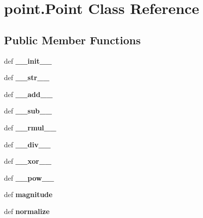 \hypertarget{classpoint_1_1Point}{\section{point.\-Point Class Reference}
\label{classpoint_1_1Point}
}
\subsection*{Public Member Functions}
\begin{DoxyCompactItemize}
\item 
\hypertarget{classpoint_1_1Point_a4f2882f4c1d41b8ed0dcc040a56df10e}{def {\bfseries \-\_\-\-\_\-init\-\_\-\-\_\-}}\label{classpoint_1_1Point_a4f2882f4c1d41b8ed0dcc040a56df10e}

\item 
\hypertarget{classpoint_1_1Point_a1ae81c5e1d69b5ccac1e489a798eff70}{def {\bfseries \-\_\-\-\_\-str\-\_\-\-\_\-}}\label{classpoint_1_1Point_a1ae81c5e1d69b5ccac1e489a798eff70}

\item 
\hypertarget{classpoint_1_1Point_aace59f3313d86fffb9315171d1f68440}{def {\bfseries \-\_\-\-\_\-add\-\_\-\-\_\-}}\label{classpoint_1_1Point_aace59f3313d86fffb9315171d1f68440}

\item 
\hypertarget{classpoint_1_1Point_a63d6c9a6aaf7b41618ff8b18336eb6bd}{def {\bfseries \-\_\-\-\_\-sub\-\_\-\-\_\-}}\label{classpoint_1_1Point_a63d6c9a6aaf7b41618ff8b18336eb6bd}

\item 
\hypertarget{classpoint_1_1Point_a4c61f633eea69f44555e8d42852cbfbc}{def {\bfseries \-\_\-\-\_\-rmul\-\_\-\-\_\-}}\label{classpoint_1_1Point_a4c61f633eea69f44555e8d42852cbfbc}

\item 
\hypertarget{classpoint_1_1Point_a74924a7729713d7115462c3390e0cba8}{def {\bfseries \-\_\-\-\_\-div\-\_\-\-\_\-}}\label{classpoint_1_1Point_a74924a7729713d7115462c3390e0cba8}

\item 
\hypertarget{classpoint_1_1Point_a63cbb86ade8b1aade58afd232fa6625f}{def {\bfseries \-\_\-\-\_\-xor\-\_\-\-\_\-}}\label{classpoint_1_1Point_a63cbb86ade8b1aade58afd232fa6625f}

\item 
\hypertarget{classpoint_1_1Point_a89e9195409206f59e74e34e16cb1176e}{def {\bfseries \-\_\-\-\_\-pow\-\_\-\-\_\-}}\label{classpoint_1_1Point_a89e9195409206f59e74e34e16cb1176e}

\item 
\hypertarget{classpoint_1_1Point_a14147c8780809dc0c0e040c95ed0222a}{def {\bfseries magnitude}}\label{classpoint_1_1Point_a14147c8780809dc0c0e040c95ed0222a}

\item 
\hypertarget{classpoint_1_1Point_ae4ef371493c544fb0c74ec8e65a533af}{def {\bfseries normalize}}\label{classpoint_1_1Point_ae4ef371493c544fb0c74ec8e65a533af}

\end{DoxyCompactItemize}
